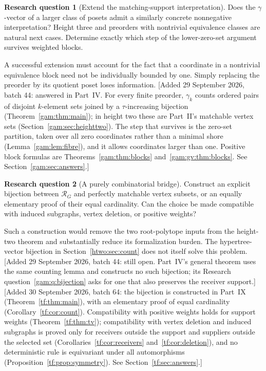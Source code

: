 \documentclass[11pt]{article}
\numberwithin{equation}{section}
\theoremstyle{definition}
\newtheorem{question}{Research question}%
\begin{document}
\begin{question}[Extend the matching-support interpretation]\label{gam:q:extend}%
Does the $\gamma$-vector of a larger class of posets admit a similarly
concrete nonnegative interpretation? Height three and preorders with
nontrivial equivalence classes are natural next cases. Determine exactly
which step of the lower-zero-set argument survives weighted blocks.
\end{question}
A successful extension must account for the fact that a coordinate in a
nontrivial equivalence block need not be individually bounded by one.
Simply replacing the preorder by its quotient poset loses information.
[Added 29 September 2026, batch 44: answered in Part~IV. For every finite
preorder, $\gamma_k$ counts ordered pairs of disjoint $k$-element sets joined
by a $\tau$-increasing bijection (Theorem~\ref{gam:thm:main}); in height two
these are Part~II's matchable vertex sets
(Section~\ref{gam:sec:heighttwo}). The step that survives is the zero-set
partition, taken over all zero coordinates rather than a minimal shore
(Lemma~\ref{gam:lem:fibre}), and it allows coordinates larger than one.
Positive block formulas are Theorems~\ref{gam:thm:blocks}
and~\ref{gam:gv:thm:blocks}. See Section~\ref{gam:sec:answers}.]

\begin{question}[A purely combinatorial bridge]\label{gam:q:bridge}%
Construct an explicit bijection between $\mathcal R_G$ and perfectly
matchable vertex subsets, or an equally elementary proof of their equal
cardinality. Can the choice be made compatible with induced subgraphs,
vertex deletion, or positive weights?
\end{question}
Such a construction would remove the two root-polytope inputs from the
height-two theorem and substantially reduce its formalization burden.
The hypertree-vector bijection in Section~\ref{htwo:sec:count} does not itself
solve this problem.
[Added 29 September 2026, batch 44: still open. Part~IV's general theorem
uses the same counting lemma and constructs no such bijection; its Research
question~\ref{gam:q:bijection} asks for one that also preserves the
receiver support.]
[Added 30 September 2026, batch 64: the bijection is constructed in
Part~IX (Theorem~\ref{tf:thm:main}), with an elementary proof of equal
cardinality (Corollary~\ref{tf:cor:count}). Compatibility with positive
weights holds for support weights (Theorem~\ref{tf:thm:tv}); compatibility
with vertex deletion and induced subgraphs is proved only for receivers
outside the support and suppliers outside the selected set
(Corollaries~\ref{tf:cor:receivers} and~\ref{tf:cor:deletion}), and no
deterministic rule is equivariant under all automorphisms
(Proposition~\ref{tf:prop:symmetry}). See Section~\ref{tf:sec:answers}.]
\end{document}
